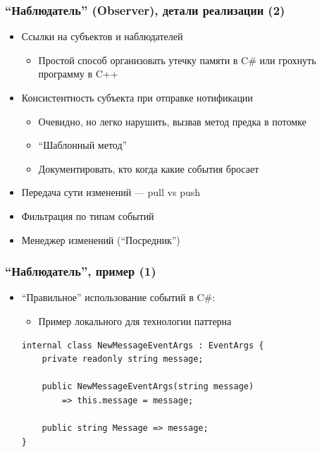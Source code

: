 \documentclass[xetex,mathserif,serif]{beamer}
\begin{document}
    \begin{frame}
        \frametitle{``Наблюдатель'' (Observer), детали реализации (2)}
        \begin{itemize}
            \item Ссылки на субъектов и наблюдателей
            \begin{itemize}
                \item Простой способ организовать утечку памяти в C\# или грохнуть программу в C++
            \end{itemize}
            \item Консистентность субъекта при отправке нотификации
            \begin{itemize}
                \item Очевидно, но легко нарушить, вызвав метод предка в потомке
                \item ``Шаблонный метод''
                \item Документировать, кто когда какие события бросает
            \end{itemize}
            \item Передача сути изменений --- pull vs push
            \item Фильтрация по типам событий
            \item Менеджер изменений (``Посредник'')
        \end{itemize}
    \end{frame}

    \begin{frame}[fragile]
        \frametitle{``Наблюдатель'', пример (1)}
        \begin{itemize}
            \item ``Правильное'' использование событий в C\#:
            \begin{itemize}
                \item Пример локального для технологии паттерна
            \end{itemize}
            \begin{verbatim}
internal class NewMessageEventArgs : EventArgs {
    private readonly string message;

    public NewMessageEventArgs(string message) 
        => this.message = message;

    public string Message => message;
}
            \end{verbatim}
        \end{itemize}
    \end{frame}
\end{document}
